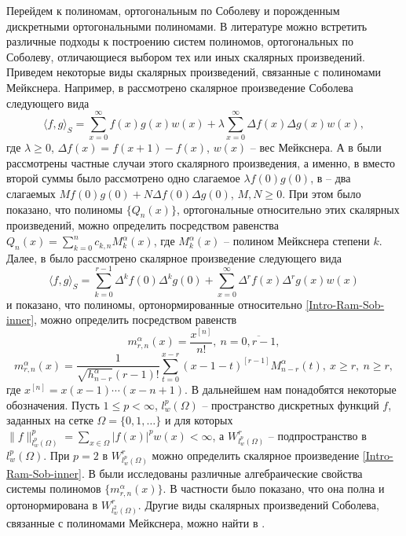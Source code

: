Перейдем к полиномам, ортогональным по Соболеву и порожденным дискретными ортогональными полиномами. В литературе можно встретить различные подходы к построению систем полиномов, ортогональных по Соболеву, отличающиеся выбором тех или иных скалярных произведений. Приведем некоторые виды скалярных произведений, связанные с полиномами Мейкснера. Например, в \cite{Ram-Ar-Go-Mar,Ram-Kh-Old} рассмотрено скалярное произведение Соболева следующего вида
$$
\langle f,g\rangle_S=\sum_{x=0}^{\infty}f(x)g(x)w(x)+\lambda\sum_{x=0}^{\infty}\Delta f(x)\Delta g(x)w(x),
$$
где $\lambda\ge 0$, $\Delta f(x)=f(x+1)-f(x)$, $w(x)$ -- вес Мейкснера. А в \cite{Ram-Bav1,Ram-Bav2} были рассмотрены частные случаи этого скалярного произведения, а именно, в \cite{Ram-Bav1} вместо второй суммы было рассмотрено одно слагаемое $\lambda f(0)g(0)$, в \cite{Ram-Bav2} -- два слагаемых $Mf(0)g(0)+N\Delta f(0)\Delta g(0)$, $M,N\ge 0$. При этом было показано, что полиномы $\{Q_n(x)\}$, ортогональные относительно этих скалярных произведений, можно определить посредством равенства $Q_n(x)=\sum_{k=0}^{n}c_{k,n}M_k^\alpha(x)$, где $M_k^\alpha(x)$ -- полином Мейкснера степени $k$. Далее, в \cite{Ram-Shar-VMJ,Ram-Shar-Sar} было рассмотрено скалярное произведение следующего вида
\begin{equation}\label{Intro-Ram-Sob-inner}
\langle f,g\rangle_S=\sum_{k=0}^{r-1}\Delta^kf(0)\Delta^kg(0)+\sum_{x=0}^\infty\Delta^rf(x)\Delta^rg(x)w(x)
\end{equation}
и показано, что полиномы, ортонормированные относительно \eqref{Intro-Ram-Sob-inner}, можно определить посредством равенств
$$
m_{r,n}^{\alpha}(x)=\frac{x^{[n]}}{n!},\ n=\overline{0,r-1},
$$
$$
m_{r,n}^{\alpha}(x)=
\frac{1}{\sqrt{h_{n-r}^\alpha}(r-1)!}\sum_{t=0}^{x-r}(x-1-t)^{[r-1]}M_{n-r}^\alpha(t),\ x\ge r,\ n\ge r,
$$
где $x^{[n]}=x(x-1)\cdots(x-n+1)$.
В дальнейшем нам понадобятся некоторые обозначения. Пусть $1\le p<\infty$, $l_w^p(\Omega)$ -- пространство дискретных функций $f$, заданных на сетке $\Omega=\{0, 1, \ldots\}$ и для которых $\|f\|_{l_{w}^p(\Omega)}^p=\sum_{x\in\Omega}|f(x)|^pw(x)<\infty$, а $W^r_{l_{w}^p(\Omega)}$ -- подпространство в $l_{w}^p(\Omega)$. При $p=2$ в $W^r_{l_{w}^p(\Omega)}$ можно определить скалярное произведение \eqref{Intro-Ram-Sob-inner}.
В \cite{Ram-Shar-Sar} были исследованы различные алгебраические свойства системы полиномов $\{m_{r,n}^{\alpha}(x)\}$. В частности было показано, что она полна и ортонормирована в $W^r_{l_w^2(\Omega)}$.
Другие виды скалярных произведений Соболева, связанные с полиномами Мейкснера, можно найти в \cite{Ram-Mor-Bal,Ram-Co-So-Vil}.

